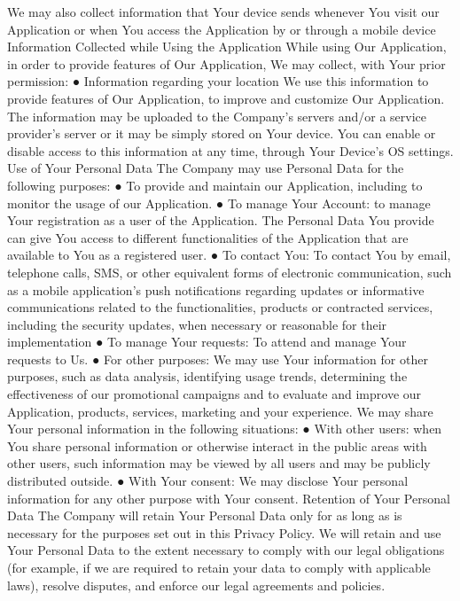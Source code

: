 We may also collect information that Your device sends whenever You visit our Application or when You access the Application by or through a mobile device
Information Collected while Using the Application
While using Our Application, in order to provide features of Our Application, We may collect, with Your prior permission:
● Information regarding your location
We use this information to provide features of Our Application, to improve and customize Our Application. The information may be uploaded to the Company's servers and/or a service provider's server or it may be simply stored on Your device.
You can enable or disable access to this information at any time, through Your Device’s OS settings.
Use of Your Personal Data
The Company may use Personal Data for the following purposes:
● To provide and maintain our Application, including to monitor the usage of our Application.
● To manage Your Account: to manage Your registration as a user of the Application. The Personal Data You provide can give You access to different functionalities of the Application that are available to You as a registered user.
● To contact You: To contact You by email, telephone calls, SMS, or other equivalent forms of electronic communication, such as a mobile application's push notifications regarding updates or informative communications related to the functionalities, products or contracted services, including the security updates, when necessary or reasonable for their implementation
● To manage Your requests: To attend and manage Your requests to Us.
● For other purposes: We may use Your information for other purposes, such as data analysis, identifying usage trends, determining the effectiveness of our promotional campaigns and to evaluate and improve our Application, products, services, marketing and your experience.
We may share Your personal information in the following situations:
● With other users: when You share personal information or otherwise interact in the public areas with other users, such information may be viewed by all users and may be publicly distributed outside.
● With Your consent: We may disclose Your personal information for any other purpose with Your consent.
Retention of Your Personal Data
The Company will retain Your Personal Data only for as long as is necessary for the purposes set out in this Privacy Policy. We will retain and use Your Personal Data to the extent necessary to comply with our legal obligations (for example, if we are required to retain your data to comply with applicable laws), resolve disputes, and enforce our legal agreements and policies.
